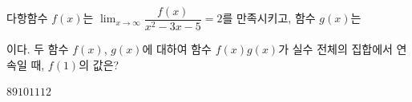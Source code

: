 다항함수 $f(x)$는 $\displaystyle\lim_{x\to\infty}\dfrac{f(x)}{x^2-3x-5}=2$를 만족시키고, 함수 $g(x)$는 \par\smallskip{}\par\smallskip\noindent 이다. 두 함수 $f(x)$, $g(x)$에 대하여 함수 $f(x)g(x)$가 실수 전체의 집합에서 연속일 때, $f(1)$의 값은?
\begin{choices32}{$8$}{$9$}{$10$}{$11$}{$12$}\end{choices32}
